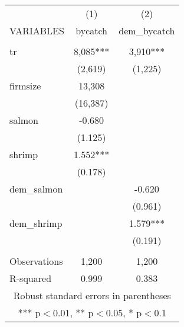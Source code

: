 \documentclass[]{article}
\begin{document}
\begin{tabular}{lcc} \hline
 & (1) & (2) \\
VARIABLES & bycatch & dem\_bycatch \\ \hline
 &  &  \\
tr & 8,085*** & 3,910*** \\
 & (2,619) & (1,225) \\
firmsize & 13,308 &  \\
 & (16,387) &  \\
salmon & -0.680 &  \\
 & (1.125) &  \\
shrimp & 1.552*** &  \\
 & (0.178) &  \\
dem\_salmon &  & -0.620 \\
 &  & (0.961) \\
dem\_shrimp &  & 1.579*** \\
 &  & (0.191) \\
 &  &  \\
Observations & 1,200 & 1,200 \\
 R-squared & 0.999 & 0.383 \\ \hline
\multicolumn{3}{c}{ Robust standard errors in parentheses} \\
\multicolumn{3}{c}{ *** p$<$0.01, ** p$<$0.05, * p$<$0.1} \\
\end{tabular}
\end{document}
